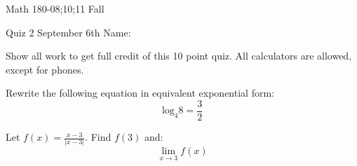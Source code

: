 \documentclass[11pt,epsfig]{article}
\begin{document}
Math 180-08;10;11 Fall

Quiz 2 September 6th \hspace{1.9in} {Name:} {\underline {\hspace{2.5in}}}
\vspace{2pc}

Show all work to get full credit of this 10 point quiz. All calculators are allowed, except for phones.
\vspace{2pc}

\begin{problem}{5}
Rewrite the following equation in equivalent exponential form:
\begin{equation}
\mathrm{log}_4 8 = \frac{3}{2}
\end{equation}
\vfill
\end{problem}

\begin{problem}{5}
Let $f(x) = \frac{x-3}{|x-3|}$. Find $f(3)$ and:
\begin{equation}
\lim_{x\to 3} f(x)
\end{equation}
\vfill
\end{problem}




\showpoints
\end{document}

